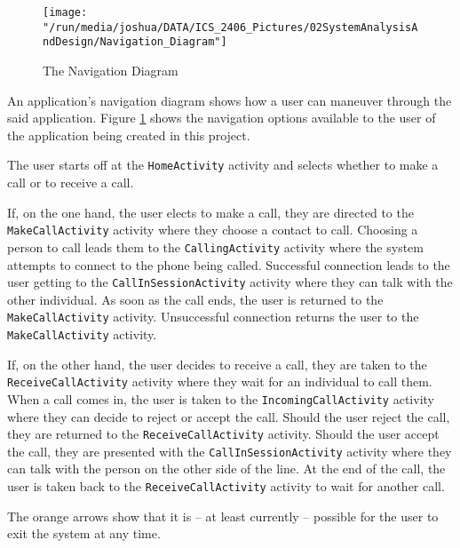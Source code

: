 \documentclass[12pt,svgnames,smaller]{article} %
\begin{document}
	\begin{figure}
		\centering
		\texttt{[image: "/run/media/joshua/DATA/ICS\_2406\_Pictures/02SystemAnalysisAndDesign/Navigation\_Diagram"]}
		\caption{The Navigation Diagram}
		\label{fig:SystemAnalysisandDesign-Navigation_Diagram}
	\end{figure}
	
	An application’s navigation diagram shows how a user can maneuver through the said application. Figure \ref{fig:SystemAnalysisandDesign-Navigation_Diagram} shows the navigation options available to the user of the application being created in this project.
	
	The user starts off at the \texttt{HomeActivity} activity and selects whether to make a call or to receive a call.
	
	If, on the one hand, the user elects to make a call, they are directed to the \texttt{MakeCallActivity} activity where they choose a contact to call. Choosing a person to call leads them to the \texttt{CallingActivity} activity where the system attempts to connect to the phone being called. Successful connection leads to the user getting to the \texttt{CallInSessionActivity} activity where they can talk with the other individual. As soon as the call ends, the user is returned to the \texttt{MakeCallActivity} activity. Unsuccessful connection returns the user to the \texttt{MakeCallActivity} activity.
	
	If, on the other hand, the user decides to receive a call, they are taken to the \texttt{ReceiveCallActivity} activity where they wait for an individual to call them. When a call comes in, the user is taken to the \texttt{IncomingCallActivity} activity where they can decide to reject or accept the call. Should the user reject the call, they are returned to the \texttt{ReceiveCallActivity} activity. Should the user accept the call, they are presented with the \texttt{CallInSessionActivity} activity where they can talk with the person on the other side of the line. At the end of the call, the user is taken back to the \texttt{ReceiveCallActivity} activity to wait for another call.
	
	The orange arrows show that it is – at least currently – possible for the user to exit the system at any time.	
	
	
\end{document}
